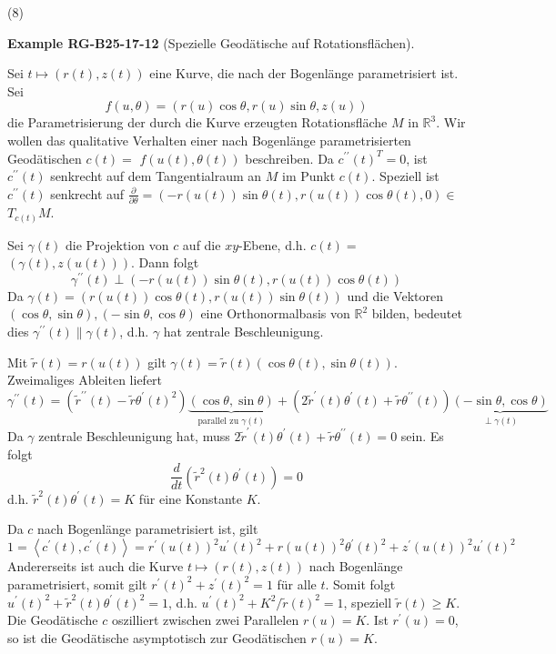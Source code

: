\documentclass[10pt, letterpaper]{article}
\newcommand{\CustomHeading}[3]{%
  \par\medskip\noindent%
  \textbf{#1 #2} \textnormal{(#3)}.\enskip%
}
\newenvironment{EXA}[2]{\begin{unitbox}\CustomHeading{Example}{#1}{#2}}{\end{unitbox}}
\begin{document}
(8) 

\begin{EXA}{RG-B25-17-12}{Spezielle Geodätische auf Rotationsflächen}
Sei $t \mapsto(r(t), z(t))$ eine Kurve, die nach der Bogenlänge parametrisiert ist. Sei
$$
f(u, \theta)=(r(u) \cos \theta, r(u) \sin \theta, z(u))
$$
die Parametrisierung der durch die Kurve erzeugten Rotationsfläche $M$ in $\mathbb{R}^{3}$. Wir wollen das qualitative Verhalten einer nach Bogenlänge parametrisierten Geodätischen $c(t)=$ $f(u(t), \theta(t))$ beschreiben. Da $c^{\prime \prime}(t)^{T}=0$, ist $c^{\prime \prime}(t)$ senkrecht auf dem Tangentialraum an $M$ im Punkt $c(t)$. Speziell ist $c^{\prime \prime}(t)$ senkrecht auf $\frac{\partial}{\partial \theta}=(-r(u(t)) \sin \theta(t), r(u(t)) \cos \theta(t), 0) \in$ $T_{c(t)} M$.

Sei $\gamma(t)$ die Projektion von $c$ auf die $x y$-Ebene, d.h. $c(t)=$ $(\gamma(t), z(u(t)))$. Dann folgt
$$
\gamma^{\prime \prime}(t) \perp(-r(u(t)) \sin \theta(t), r(u(t)) \cos \theta(t))
$$
Da $\gamma(t)=(r(u(t)) \cos \theta(t), r(u(t)) \sin \theta(t))$ und die Vektoren $(\cos \theta, \sin \theta),(-\sin \theta, \cos \theta)$ eine Orthonormalbasis von $\mathbb{R}^{2}$ bilden, bedeutet dies $\gamma^{\prime \prime}(t) \| \gamma(t)$, d.h. $\gamma$ hat zentrale Beschleunigung.

Mit $\tilde{r}(t)=r(u(t))$ gilt $\gamma(t)=\tilde{r}(t)(\cos \theta(t), \sin \theta(t))$. Zweimaliges Ableiten liefert
$$
\gamma^{\prime \prime}(t)=\left(\tilde{r}^{\prime \prime}(t)-\tilde{r} \theta^{\prime}(t)^{2}\right) \underbrace{(\cos \theta, \sin \theta)}_{\text {parallel zu } \gamma(t)}+\left(2 \tilde{r}^{\prime}(t) \theta^{\prime}(t)+\tilde{r} \theta^{\prime \prime}(t)\right) \underbrace{(-\sin \theta, \cos \theta)}_{\perp \gamma(t)}
$$
Da $\gamma$ zentrale Beschleunigung hat, muss $2 \tilde{r}^{\prime}(t) \theta^{\prime}(t)+\tilde{r} \theta^{\prime \prime}(t)=0$ sein. Es folgt
$$
\frac{d}{d t}\left(\tilde{r}^{2}(t) \theta^{\prime}(t)\right)=0
$$
d.h. $\tilde{r}^{2}(t) \theta^{\prime}(t)=K$ für eine Konstante $K$.

Da $c$ nach Bogenlänge parametrisiert ist, gilt
$$
1=\left\langle c^{\prime}(t), c^{\prime}(t)\right\rangle=r^{\prime}(u(t))^{2} u^{\prime}(t)^{2}+r(u(t))^{2} \theta^{\prime}(t)^{2}+z^{\prime}(u(t))^{2} u^{\prime}(t)^{2}
$$
Andererseits ist auch die Kurve $t \mapsto(r(t), z(t))$ nach Bogenlänge parametrisiert, somit gilt $r^{\prime}(t)^{2}+z^{\prime}(t)^{2}=1$ für alle $t$. Somit folgt $u^{\prime}(t)^{2}+\tilde{r}^{2}(t) \theta^{\prime}(t)^{2}=1$, d.h. $u^{\prime}(t)^{2}+K^{2} / \tilde{r}(t)^{2}=1$, speziell $\tilde{r}(t) \geq K$. Die Geodätische $c$ oszilliert zwischen zwei Parallelen $r(u)=K$. Ist $r^{\prime}(u)=0$, so ist die Geodätische asymptotisch zur Geodätischen $r(u)=K$.
\end{EXA}
\end{document}
